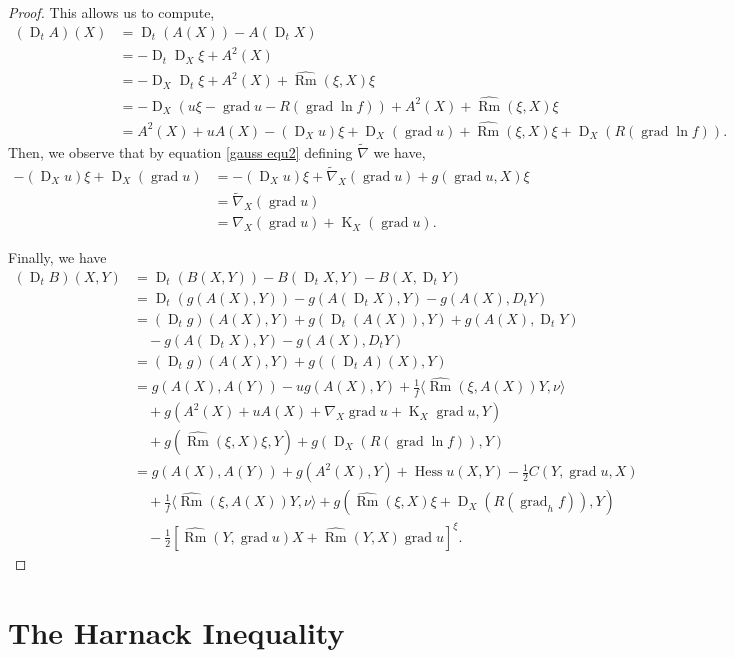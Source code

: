 \documentclass{amsart}
\theoremstyle{definition}
\theoremstyle{remark}
\newcommand{\ip}[2]{\ensuremath{\langle{#1},{#2}\rangle}}
\DeclareMathOperator{\grad}{grad}
\DeclareMathOperator{\Rm}{Rm}
\DeclareMathOperator{\hess}{Hess}
\DeclareMathOperator{\diff}{K}
\DeclareMathOperator{\D}{D}
\numberwithin{equation}{section}
\begin{document}
\begin{proof}
This allows us to compute,
\[
\begin{split}
(\D_t A)(X) &= \D_t (A(X)) - A(\D_t X) \\
&= - \D_t \D_X \xi + A^2(X) \\
&= -\D_X \D_t \xi + A^2(X) + \widehat{\Rm} (\xi, X) \xi \\
&= -\D_X \left(u\xi - \grad u - R(\grad \ln f)\right) + A^2(X) + \widehat{\Rm} (\xi, X) \xi \\
&= A^2(X) + u A(X) -(\D_X u)\xi + \D_X (\grad u) + \widehat{\Rm} (\xi, X) \xi + \D_X (R(\grad \ln f)).
\end{split}
\]
Then, we observe that by equation \eqref{gauss equ2} defining $\tilde{\nabla}$ we have,
\[
\begin{split}
-(\D_X u)\xi + \D_X (\grad u) &= -(\D_X u)\xi + \tilde{\nabla}_X (\grad u) + g(\grad u, X) \xi \\
&= \tilde{\nabla}_X (\grad u) \\
&= \nabla_X (\grad u) + \diff_X (\grad u).
\end{split}
\]

Finally, we have
\[
\begin{split}
(\D_t B) (X, Y) &= \D_t (B(X, Y)) - B(\D_t X, Y) - B(X, \D_t Y) \\
&= \D_t (g(A(X), Y)) - g(A(\D_tX), Y) - g(A(X), D_t Y) \\
&= (\D_t g)(A(X), Y) + g(\D_t(A(X)), Y) + g(A(X), \D_t Y) \\
&\quad - g(A(\D_tX), Y) - g(A(X), D_t Y) \\
&= (\D_t g)(A(X), Y) + g((\D_t A)(X), Y) \\
&= g(A(X), A(Y)) - u g(A(X), Y) + \frac{1}{f} \ip{\hat{\Rm} (\xi, A(X))Y}{\nu} \\
&\quad + g(A^2(X) + u A(X) + \nabla_X \grad u + \diff_X \grad u, Y) \\
&\quad + g(\widehat{\Rm}(\xi, X)\xi, Y) + g(\D_X (R(\grad \ln f)), Y) \\
&= g(A(X), A(Y)) + g(A^2(X), Y) + \hess u (X, Y) -\frac{1}{2} C(Y, \grad u, X) \\
&\quad +\frac{1}{f} \ip{\hat{\Rm} (\xi, A(X))Y}{\nu} + g(\widehat{\Rm}(\xi, X)\xi  + \D_X (R(\grad_h f)), Y) \\
&\quad -\frac{1}{2} \left[\widehat{\Rm} (Y, \grad u)X +  \widehat{\Rm} (Y, X) \grad u\right]^{\xi}.
\end{split}
\]
\end{proof}

\section{The Harnack Inequality}
\end{document}
